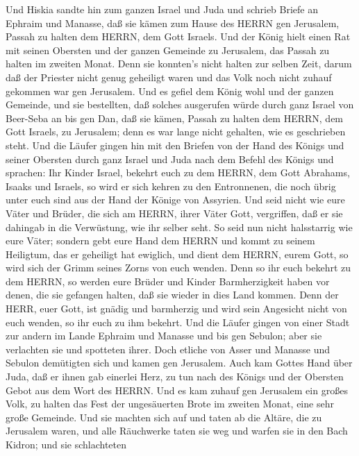  Und Hiskia sandte hin zum ganzen Israel und Juda und
schrieb Briefe an Ephraim und Manasse, daß sie kämen zum Hause des HERRN
gen Jerusalem, Passah zu halten dem HERRN, dem Gott Israels.
 Und der König hielt einen Rat mit seinen Obersten und der
ganzen Gemeinde zu Jerusalem, das Passah zu halten im zweiten Monat.
 Denn sie konnten's nicht halten zur selben Zeit, darum daß
der Priester nicht genug geheiligt waren und das Volk noch nicht zuhauf
gekommen war gen Jerusalem.  Und es gefiel dem König wohl
und der ganzen Gemeinde,  und sie bestellten, daß solches
ausgerufen würde durch ganz Israel von Beer-Seba an bis gen Dan, daß sie
kämen, Passah zu halten dem HERRN, dem Gott Israels, zu Jerusalem; denn
es war lange nicht gehalten, wie es geschrieben steht.  Und
die Läufer gingen hin mit den Briefen von der Hand des Königs und seiner
Obersten durch ganz Israel und Juda nach dem Befehl des Königs und
sprachen: Ihr Kinder Israel, bekehrt euch zu dem HERRN, dem Gott
Abrahams, Isaaks und Israels, so wird er sich kehren zu den Entronnenen,
die noch übrig unter euch sind aus der Hand der Könige von Assyrien.
 Und seid nicht wie eure Väter und Brüder, die sich am
HERRN, ihrer Väter Gott, vergriffen, daß er sie dahingab in die
Verwüstung, wie ihr selber seht.  So seid nun nicht
halsstarrig wie eure Väter; sondern gebt eure Hand dem HERRN und kommt
zu seinem Heiligtum, das er geheiligt hat ewiglich, und dient dem HERRN,
eurem Gott, so wird sich der Grimm seines Zorns von euch wenden.
 Denn so ihr euch bekehrt zu dem HERRN, so werden eure
Brüder und Kinder Barmherzigkeit haben vor denen, die sie gefangen
halten, daß sie wieder in dies Land kommen. Denn der HERR, euer Gott,
ist gnädig und barmherzig und wird sein Angesicht nicht von euch wenden,
so ihr euch zu ihm bekehrt.  Und die Läufer gingen von
einer Stadt zur andern im Lande Ephraim und Manasse und bis gen Sebulon;
aber sie verlachten sie und spotteten ihrer.  Doch etliche
von Asser und Manasse und Sebulon demütigten sich und kamen gen
Jerusalem.  Auch kam Gottes Hand über Juda, daß er ihnen
gab einerlei Herz, zu tun nach des Königs und der Obersten Gebot aus dem
Wort des HERRN.  Und es kam zuhauf gen Jerusalem ein großes
Volk, zu halten das Fest der ungesäuerten Brote im zweiten Monat, eine
sehr große Gemeinde.  Und sie machten sich auf und taten ab
die Altäre, die zu Jerusalem waren, und alle Räuchwerke taten sie weg
und warfen sie in den Bach Kidron;  und sie schlachteten
